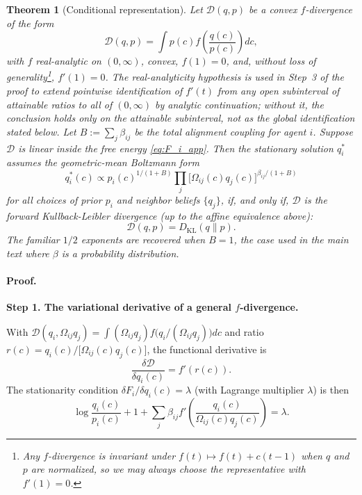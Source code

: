 \documentclass[11pt]{article}
\newtheorem{theorem}{Theorem}
\begin{document}
\begin{theorem}[Conditional representation]\label{thm:representation_app}
Let\/ $\mathcal{D}(q,p)$ be a convex $f$-divergence of the form
\[
\mathcal{D}(q,p)
= \int p(c)f\left(\frac{q(c)}{p(c)}\right)dc,
\]
with $f$ \emph{real-analytic on $(0, \infty)$}, convex, $f(1)=0$, and, without loss of generality\footnote{Any $f$-divergence is invariant under $f(t)\mapsto f(t)+c(t-1)$ when $q$ and $p$ are normalized, so we may always choose the representative with $f'(1)=0$.}, $f'(1)=0$. The real-analyticity hypothesis is used in Step~3 of the proof to extend pointwise identification of $f'(t)$ from any open subinterval of attainable ratios to all of $(0, \infty)$ by analytic continuation; without it, the conclusion holds only on the attainable subinterval, not as the global identification stated below. Let $B := \sum_j \beta_{ij}$ be the total alignment coupling for agent $i$. Suppose $\mathcal{D}$ is linear inside the free energy \eqref{eq:F_i_app}. Then the stationary solution $q_i^*$ assumes the geometric-mean Boltzmann form
\begin{equation}
q_i^*(c) \propto p_i(c)^{1/(1+B)}\prod_{j}\bigl[\Omega_{ij}(c)q_j(c)\bigr]^{\beta_{ij}/(1+B)}
\label{eq:geometric_mean_target_app}
\end{equation}
for all choices of prior $p_i$ and neighbor beliefs $\{q_j\}$, if, and only if, $\mathcal{D}$ is the forward Kullback-Leibler divergence (up to the affine equivalence above):
\[
\mathcal{D}(q,p) = D_{\mathrm{KL}}(q\|p).
\]
The familiar $1/2$ exponents are recovered when $B = 1$, the case used in the main text where $\beta$ is a probability distribution.
\end{theorem}

\paragraph{Proof.}

\textbf{Step 1. The variational derivative of a general $f$-divergence.}

With $\mathcal{D}(q_i,\Omega_{ij}q_j)=\int (\Omega_{ij}q_j)f\bigl(q_i/(\Omega_{ij}q_j)\bigr)dc$ and ratio $r(c)=q_i(c)/\bigl[\Omega_{ij}(c)q_j(c)\bigr]$, the functional derivative is
\begin{equation}
\frac{\delta\mathcal{D}}{\delta q_i(c)} = f'(r(c)).
\end{equation}
The stationarity condition $\delta F_i/\delta q_i(c)=\lambda$ (with Lagrange multiplier $\lambda$) is then
\begin{equation}
\log\frac{q_i(c)}{p_i(c)} + 1
+ \sum_j \beta_{ij}f'\left(\frac{q_i(c)}{\Omega_{ij}(c)q_j(c)}\right) = \lambda.
\label{eq:general_stationarity_app}
\end{equation}
\end{document}

